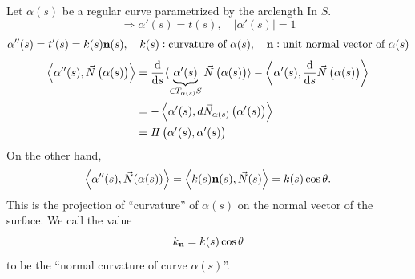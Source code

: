     Let \(\alpha(s)\) be a regular curve parametrized by the arclength In
    \(S\). 
    \[
        \Rightarrow \alpha'(s)=t(s),\quad \left|\alpha'(s)\right|=1
    \]
    \[
        \alpha''(s)=t'(s)=k(s)\vb{n}(s),\quad k(s):\text{curvature of
        }\alpha(s),\quad\vb{n}:\text{unit normal vector of }\alpha(s)
    \]
\begin{align*}
    \left\langle\alpha''(s),\vec{N}\left(\alpha(s)\right)\right\rangle
    &=\dv{s}\langle\underbrace{\alpha'(s)}_{\in T_{\alpha(s)}S}
    \vec{N}\left(\alpha(s)\right)\rangle-\left\langle
        \alpha'(s),\dv{s}\vec{N}\left(\alpha(s)\right)
    \right\rangle\\
    &=-\left\langle\alpha'(s),d\vec{N}_{\alpha(s)}\left(\alpha'(s)
    \right)\right\rangle\\
    &=I\!I\left(\alpha'(s),\alpha'(s)\right)
\end{align*}
On the other hand, 
\[
    \left\langle\alpha''(s),\vec{N}(\alpha(s))\right\rangle    
    =\left\langle k(s) \vb{n}(s),\vec{N}(s)\right\rangle
    =k(s)\cos \theta.
\]
This is the projection of ``curvature'' of \(\alpha(s)\) on the normal
vector of the surface. We call the value
\[
    k_{\vb{n}}=k(s)\cos \theta
\]
to be the ``normal curvature of curve \(\alpha(s)\)''.

